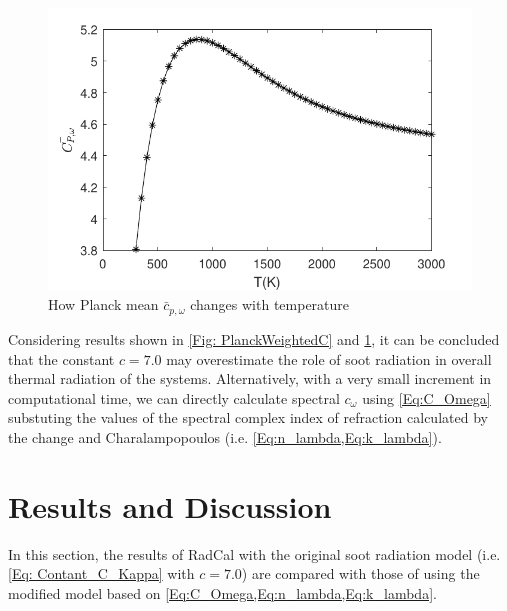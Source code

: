 \documentclass[3p]{elsarticle}
\begin{document}
\begin{figure}
	\centering\includegraphics[width=12cm]{Figures/Fig2_P_C_eta.pdf}
	\caption{How  Planck  mean  \({\bar c_{p,\omega }}\)  changes  with  temperature}
	\label{Fig: PlanckWeightedCEta}
\end{figure}
Considering results shown in  \cref{Fig: PlanckWeightedC} and \cref{Fig: PlanckWeightedCEta}, it can be concluded that the constant \(c = 7.0\) may overestimate the role of soot radiation in overall thermal radiation of the systems. Alternatively, with a very small increment in computational time, we can directly calculate spectral  \(c_\omega\) using \cref{Eq:C_Omega} substuting the values of the spectral complex index of refraction calculated by the change and  Charalampopoulos \cite{ChangeCharalampopoulos1990} (i.e. \cref{Eq:n_lambda,Eq:k_lambda}).

\section{Results and Discussion}
In this section, the results of RadCal with the original soot radiation model (i.e. \cref{Eq: Contant_C_Kappa} with \(c = 7.0\)) are compared with those of using the modified model based on \cref{Eq:C_Omega,Eq:n_lambda,Eq:k_lambda}.
\end{document}
